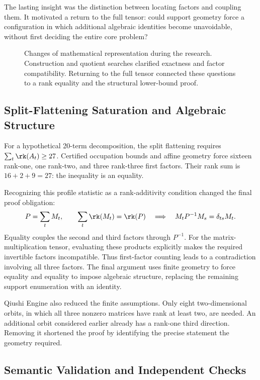 The lasting insight was the distinction between locating factors and
coupling them. It motivated a return to the full tensor: could support
geometry force a configuration in which additional algebraic identities
become unavoidable, without first deciding the entire core problem?

\begin{figure}[tbp]
  \centering
  \makebox[\linewidth][c]{\unskip}
  \caption{Changes of mathematical representation during the research.
  Construction and quotient searches clarified exactness and factor
  compatibility. Returning to the full tensor connected these questions
  to a rank equality and the structural lower-bound proof.}
  \label{fig:research-route}
\end{figure}

\subsection{Split-Flattening Saturation and Algebraic Structure}

For a hypothetical 20-term decomposition, the split flattening requires
$\sum_t\rk(A_t)\ge27$. Certified occupation bounds and affine geometry
force sixteen rank-one, one rank-two, and three rank-three first factors.
Their rank sum is $16+2+9=27$: the inequality is an equality.

Recognizing this profile statistic as a rank-additivity condition changed
the final proof obligation:
\[
  P=\sum_t M_t,\qquad \sum_t\rk(M_t)=\rk(P)
  \quad\Longrightarrow\quad M_tP^{-1}M_s=\delta_{ts}M_t.
\]
Equality couples the second and third factors through $P^{-1}$. For the
matrix-multiplication tensor, evaluating these products explicitly makes
the required invertible factors incompatible. Thus first-factor counting
leads to a contradiction involving all three factors. The final argument
uses finite geometry to force equality and equality to impose algebraic
structure, replacing the remaining support enumeration with an identity.

Qiushi Engine also reduced the finite assumptions. Only eight
two-dimensional orbits, in which all three nonzero matrices have rank
at least two, are needed. An additional orbit considered earlier already
has a rank-one third direction. Removing it shortened the proof by
identifying the precise statement the geometry required.

\subsection{Semantic Validation and Independent Checks}

